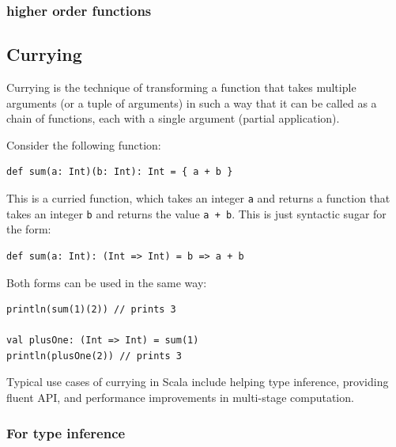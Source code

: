 \subsubsection{higher order functions}

\subsection{Currying}

Currying is the technique of transforming a function that takes multiple arguments (or a tuple of arguments) in such a way that it can be called as a chain of functions, each with a single argument (partial application).

Consider the following function:
\begin{lstlisting}
def sum(a: Int)(b: Int): Int = { a + b }
\end{lstlisting}
This is a curried function, which takes an integer \texttt{a} and returns a function that takes an integer \texttt{b} and returns the value \texttt{a + b}. This is just syntactic sugar for the form:
\begin{lstlisting}
def sum(a: Int): (Int => Int) = b => a + b
\end{lstlisting}
Both forms can be used in the same way:
\begin{lstlisting}
println(sum(1)(2)) // prints 3

val plusOne: (Int => Int) = sum(1)
println(plusOne(2)) // prints 3
\end{lstlisting}

Typical use cases of currying in Scala include helping type inference, providing fluent API, and performance improvements in multi-stage computation.

\subsubsection{For type inference}

